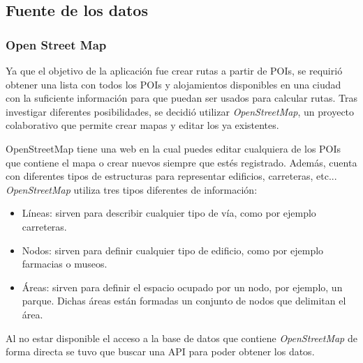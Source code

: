 \subsection[Fuente de los datos]{Fuente de los datos}
\subsubsection[OSM]{Open Street Map}
Ya que el objetivo de la aplicación fue crear rutas a partir de POIs, se requirió obtener una lista con todos los POIs y alojamientos disponibles en una ciudad con la suficiente información para que puedan ser usados para calcular rutas.
Tras investigar diferentes posibilidades, se decidió utilizar \textit{OpenStreetMap}, un proyecto colaborativo que permite crear mapas y editar los ya existentes.\newline

OpenStreetMap tiene una web \cite{openstreetmap} en la cual puedes editar cualquiera de los POIs que contiene el mapa o crear nuevos siempre que estés registrado. Además, cuenta con diferentes tipos de estructuras para representar edificios, carreteras, etc... \textit{OpenStreetMap} utiliza tres tipos diferentes de información:\newline
\begin{itemize}
	\item Líneas: sirven para describir cualquier tipo de vía, como por ejemplo carreteras.
	\item Nodos: sirven para definir cualquier tipo de edificio, como por ejemplo farmacias o museos.
	\item Áreas: sirven para definir el espacio ocupado por un nodo, por ejemplo, un parque. Dichas áreas están formadas un conjunto de nodos que delimitan el área.
\end{itemize}
Al no estar disponible el acceso a la base de datos que contiene \textit{OpenStreetMap} de forma directa se tuvo que buscar una API para poder obtener los datos.
